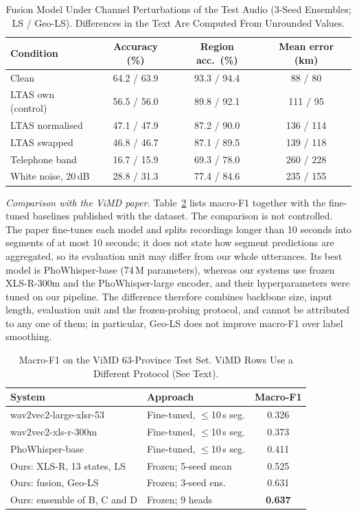 \documentclass[conference]{IEEEtran}
\begin{document}
\begin{table}[t]
\centering
\caption{Fusion Model Under Channel Perturbations of the Test Audio (3-Seed Ensembles; LS / Geo-LS). Differences in the Text Are Computed From Unrounded Values.}
\label{tab:robust}
\setlength{\tabcolsep}{3pt}
\begin{tabular}{@{}lccc@{}}
\toprule
Condition & Accuracy (\%) & Region acc.\ (\%) & Mean error (km) \\
\midrule
Clean & 64.2 / 63.9 & 93.3 / 94.4 & 88 / 80 \\
LTAS own (control) & 56.5 / 56.0 & 89.8 / 92.1 & 111 / 95 \\
LTAS normalised & 47.1 / 47.9 & 87.2 / 90.0 & 136 / 114 \\
LTAS swapped & 46.8 / 46.7 & 87.1 / 89.5 & 139 / 118 \\
Telephone band & 16.7 / 15.9 & 69.3 / 78.0 & 260 / 228 \\
White noise, 20\,dB & 28.8 / 31.3 & 77.4 / 84.6 & 235 / 155 \\
\bottomrule
\end{tabular}
\end{table}

\textit{Comparison with the ViMD paper.} Table~\ref{tab:sota} lists macro-F1 together with the fine-tuned baselines published with the dataset. The comparison is not controlled. The paper fine-tunes each model and splits recordings longer than 10 seconds into segments of at most 10 seconds; it does not state how segment predictions are aggregated, so its evaluation unit may differ from our whole utterances. Its best model is PhoWhisper-base (74\,M parameters), whereas our systems use frozen XLS-R-300m and the PhoWhisper-large encoder, and their hyperparameters were tuned on our pipeline. The difference therefore combines backbone size, input length, evaluation unit and the frozen-probing protocol, and cannot be attributed to any one of them; in particular, Geo-LS does not improve macro-F1 over label smoothing.

\begin{table}[t]
\centering
\caption{Macro-F1 on the ViMD 63-Province Test Set. ViMD Rows Use a Different Protocol (See Text).}
\label{tab:sota}
\setlength{\tabcolsep}{3pt}
\begin{tabular}{@{}llc@{}}
\toprule
System & Approach & Macro-F1 \\
\midrule
wav2vec2-large-xlsr-53~\cite{vimd} & Fine-tuned, $\le$10\,s seg. & 0.326 \\
wav2vec2-xls-r-300m~\cite{vimd} & Fine-tuned, $\le$10\,s seg. & 0.373 \\
PhoWhisper-base~\cite{vimd} & Fine-tuned, $\le$10\,s seg. & 0.411 \\
\midrule
Ours: XLS-R, 13 states, LS & Frozen; 5-seed mean & 0.525 \\
Ours: fusion, Geo-LS & Frozen; 3-seed ens. & 0.631 \\
Ours: ensemble of B, C and D & Frozen; 9 heads & \textbf{0.637} \\
\bottomrule
\end{tabular}
\end{table}
\end{document}
